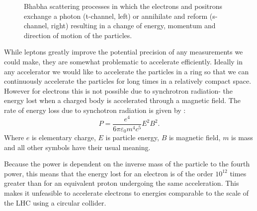 \begin{figure}
  \centering
  \caption[ISR Processes For An Electron Positron Collider]{Bhabha scattering processes in which the electrons and positrons exchange a photon (t-channel, left) or annihilate and reform (s-channel, right) resulting in a change of energy, momentum and direction of motion of the particles.}
  \label{Fig:Bhabha}
\end{figure}
While leptons greatly improve the potential precision of any measurements we could make, they are somewhat problematic to accelerate efficiently. Ideally in any accelerator we would like to accelerate the particles in a ring so that we can continuously accelerate the particles for long times in a relatively compact space. However for electrons this is not possible due to synchrotron radiation- the energy lost when a charged body is accelerated through a magnetic field. The rate of energy loss due to synchotron radiation is given by :
\begin{equation}
\label{Eq:synchotron radiation}
P = \frac{e^4}{6\pi\varepsilon_0m^4c^5}E^2B^2.
\end{equation}
Where $e$ is elementary charge, $E$ is particle energy, $B$ is magnetic field, $m$ is mass and all other symbols have their usual meaning.

Because the power is dependent on the inverse mass of the particle to the fourth power, this means that the energy lost for an electron is of the order ${10^{12}}$ times greater than for an equivalent proton undergoing the same acceleration. This makes it unfeasible to accelerate electrons to energies comparable to the scale of the \ac{LHC} using a circular collider.

